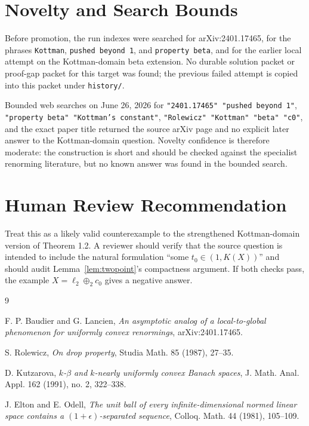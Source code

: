 \documentclass[11pt]{article}
\begin{document}
\section*{Novelty and Search Bounds}

Before promotion, the run indexes were searched for arXiv:2401.17465, for the
phrases \texttt{Kottman}, \texttt{pushed beyond 1}, and
\texttt{property beta}, and for the earlier local attempt on the
Kottman-domain beta extension.  No durable solution packet or proof-gap packet
for this target was found; the previous failed attempt is copied into this
packet under \texttt{history/}.

Bounded web searches on June 26, 2026 for
\texttt{"2401.17465" "pushed beyond 1"},
\texttt{"property beta" "Kottman's constant"},
\texttt{"Rolewicz" "Kottman" "beta" "c0"},
and the exact paper title returned the source arXiv page and no explicit later
answer to the Kottman-domain question.  Novelty confidence is therefore
moderate: the construction is short and should be checked against the
specialist renorming literature, but no known answer was found in the bounded
search.

\section*{Human Review Recommendation}

Treat this as a likely valid counterexample to the strengthened
Kottman-domain version of Theorem 1.2.  A reviewer should verify that the
source question is intended to include the natural formulation ``some
$t_0\in(1,K(X))$'' and should audit Lemma~\ref{lem:twopoint}'s compactness
argument.  If both checks pass, the example $X=\ell_2\oplus_2 c_0$ gives a
negative answer.

\begin{thebibliography}{9}

F. P. Baudier and G. Lancien,
\emph{An asymptotic analog of a local-to-global phenomenon for uniformly
convex renormings}, arXiv:2401.17465.

S. Rolewicz,
\emph{On drop property}, Studia Math. 85 (1987), 27--35.

D. Kutzarova,
\emph{$k$-$\beta$ and $k$-nearly uniformly convex Banach spaces},
J. Math. Anal. Appl. 162 (1991), no. 2, 322--338.

J. Elton and E. Odell,
\emph{The unit ball of every infinite-dimensional normed linear space contains
a $(1+\epsilon)$-separated sequence}, Colloq. Math. 44 (1981), 105--109.

\end{thebibliography}
\end{document}
